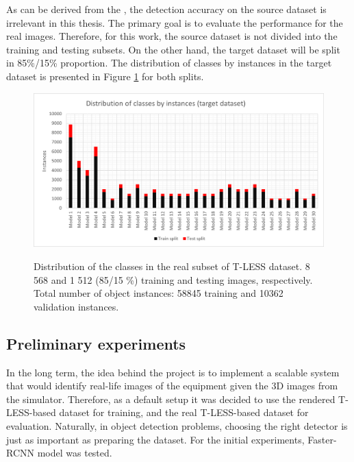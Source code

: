 As can be derived from the , the detection accuracy on the source dataset is irrelevant in this thesis. The primary goal is to evaluate the performance for the real images. Therefore, for this work, the source dataset is not divided into the training and testing subsets. On the other hand, the target dataset will be split in 85\%/15\%  proportion. The distribution of classes by instances in the target dataset is presented in Figure \ref{tless_distribution_real} for both splits.   

\begin{figure}[htb]
	\begin{center}
		\includegraphics[width=14cm]{./real_distribution.png}
	\end{center}
	\caption{Distribution of the classes in the real subset of T-LESS dataset. 8 568 and 1 512 (85/15 \%) training and testing images, respectively. Total number of object instances: 58845 training and 10362 validation instances.}
	\begin{center}
		\label{tless_distribution_real}
	\end{center}
\end{figure}
\FloatBarrier

\subsection{Preliminary experiments}
In the long term, the idea behind the project is to implement a scalable system that would identify real-life images of the equipment given the 3D images from the simulator. Therefore, as a default setup it was decided to use the rendered T-LESS-based dataset for training, and the real T-LESS-based dataset for evaluation. Naturally, in object detection problems, choosing the right detector is just as important as preparing the dataset. For the initial experiments, Faster-RCNN  \cite{Girshick2015} model was tested.

